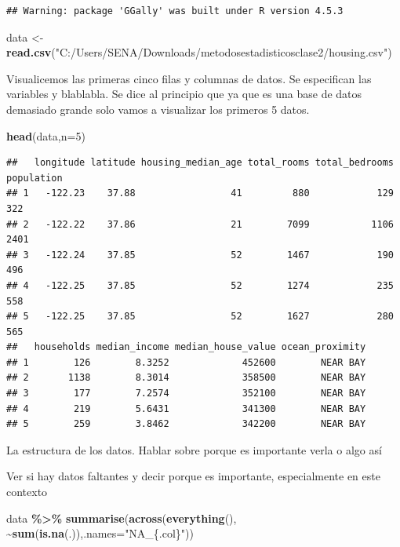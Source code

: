 \documentclass[
]{book}
\newenvironment{Shaded}{\begin{snugshade}}{\end{snugshade}}
\newcommand{\AttributeTok}[1]{\textcolor[rgb]{0.13,0.29,0.53}{#1}}
\newcommand{\DecValTok}[1]{\textcolor[rgb]{0.00,0.00,0.81}{#1}}
\newcommand{\FunctionTok}[1]{\textcolor[rgb]{0.13,0.29,0.53}{\textbf{#1}}}
\newcommand{\NormalTok}[1]{#1}
\newcommand{\OtherTok}[1]{\textcolor[rgb]{0.56,0.35,0.01}{#1}}
\newcommand{\SpecialCharTok}[1]{\textcolor[rgb]{0.81,0.36,0.00}{\textbf{#1}}}
\newcommand{\StringTok}[1]{\textcolor[rgb]{0.31,0.60,0.02}{#1}}
\begin{document}
\begin{verbatim}
## Warning: package 'GGally' was built under R version 4.5.3
\end{verbatim}

\begin{Shaded}
\begin{Highlighting}[]
\NormalTok{data }\OtherTok{\textless{}{-}} \FunctionTok{read.csv}\NormalTok{(}\StringTok{"C:/Users/SENA/Downloads/metodosestadisticosclase2/housing.csv"}\NormalTok{)}
\end{Highlighting}
\end{Shaded}

Visualicemos las primeras cinco filas y columnas de datos. Se especifican las variables y blablabla. Se dice al principio que ya que es una base de datos demasiado grande solo vamos a visualizar los primeros 5 datos.

\begin{Shaded}
\begin{Highlighting}[]
\FunctionTok{head}\NormalTok{(data,}\AttributeTok{n=}\DecValTok{5}\NormalTok{)}
\end{Highlighting}
\end{Shaded}

\begin{verbatim}
##   longitude latitude housing_median_age total_rooms total_bedrooms population
## 1   -122.23    37.88                 41         880            129        322
## 2   -122.22    37.86                 21        7099           1106       2401
## 3   -122.24    37.85                 52        1467            190        496
## 4   -122.25    37.85                 52        1274            235        558
## 5   -122.25    37.85                 52        1627            280        565
##   households median_income median_house_value ocean_proximity
## 1        126        8.3252             452600        NEAR BAY
## 2       1138        8.3014             358500        NEAR BAY
## 3        177        7.2574             352100        NEAR BAY
## 4        219        5.6431             341300        NEAR BAY
## 5        259        3.8462             342200        NEAR BAY
\end{verbatim}

La estructura de los datos. Hablar sobre porque es importante verla o algo así

Ver si hay datos faltantes y decir porque es importante, especialmente en este contexto

\begin{Shaded}
\begin{Highlighting}[]
\NormalTok{data }\SpecialCharTok{\%\textgreater{}\%}
  \FunctionTok{summarise}\NormalTok{(}\FunctionTok{across}\NormalTok{(}\FunctionTok{everything}\NormalTok{(), }\SpecialCharTok{\textasciitilde{}}\FunctionTok{sum}\NormalTok{(}\FunctionTok{is.na}\NormalTok{(.)),}\AttributeTok{.names=}\StringTok{"NA\_\{.col\}"}\NormalTok{))}
\end{Highlighting}
\end{Shaded}
\end{document}
